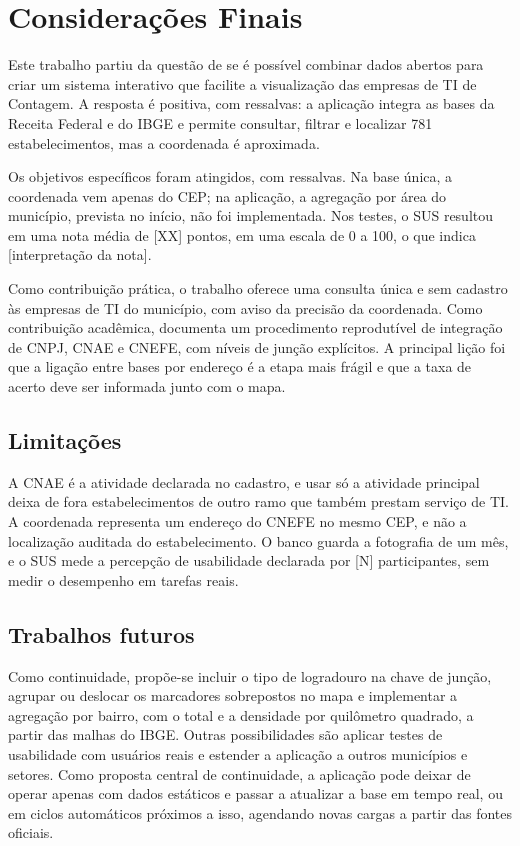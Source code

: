 \section{Considerações Finais}

Este trabalho partiu da questão de se é possível combinar dados abertos para criar um sistema interativo que facilite a visualização das empresas de TI de Contagem.
A resposta é positiva, com ressalvas: a aplicação integra as bases da Receita Federal e do IBGE e permite consultar, filtrar e localizar 781 estabelecimentos, mas a coordenada é aproximada.

Os objetivos específicos foram atingidos, com ressalvas.
Na base única, a coordenada vem apenas do CEP; na aplicação, a agregação por área do município, prevista no início, não foi implementada.
Nos testes, o SUS resultou em uma nota média de [XX] pontos, em uma escala de 0 a 100, o que indica [interpretação da nota].

Como contribuição prática, o trabalho oferece uma consulta única e sem cadastro às empresas de TI do município, com aviso da precisão da coordenada.
Como contribuição acadêmica, documenta um procedimento reprodutível de integração de CNPJ, CNAE e CNEFE, com níveis de junção explícitos.
A principal lição foi que a ligação entre bases por endereço é a etapa mais frágil e que a taxa de acerto deve ser informada junto com o mapa.

\subsection{Limitações}

A CNAE é a atividade declarada no cadastro, e usar só a atividade principal deixa de fora estabelecimentos de outro ramo que também prestam serviço de TI.
A coordenada representa um endereço do CNEFE no mesmo CEP, e não a localização auditada do estabelecimento.
O banco guarda a fotografia de um mês, e o SUS mede a percepção de usabilidade declarada por [N] participantes, sem medir o desempenho em tarefas reais.

\subsection{Trabalhos futuros}

Como continuidade, propõe-se incluir o tipo de logradouro na chave de junção, agrupar ou deslocar os marcadores sobrepostos no mapa e implementar a agregação por bairro, com o total e a densidade por quilômetro quadrado, a partir das malhas do IBGE.
Outras possibilidades são aplicar testes de usabilidade com usuários reais e estender a aplicação a outros municípios e setores.
Como proposta central de continuidade, a aplicação pode deixar de operar apenas com dados estáticos e passar a atualizar a base em tempo real, ou em ciclos automáticos próximos a isso, agendando novas cargas a partir das fontes oficiais.

